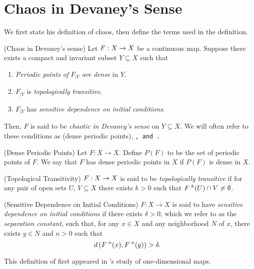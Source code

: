 \documentclass[10pt,draft,twoside]{book}
\begin{document}
\section{Chaos in Devaney's Sense}
We first state his definition of chaos, then define the terms used in the definition.
\begin{definition}
  (Chaos in Devaney's sense) 
  Let $F: X\rightarrow X$ be a continuous map.
  Suppose there exists a compact and invariant subset $Y \subseteq X$ such that
  \begin{enumerate}
    \item \textit{Periodic points of} $F_{|Y}$ \textit{are dense} in $Y$.
    \item $F_{|Y}$ is \textit{topologically transitive}.
    \item $F_{|Y}$ has \textit{sensitive dependence on initial conditions}.
  \end{enumerate}
  Then, $F$ is said to be \textit{chaotic in Devaney's sense} on $Y \subseteq X$.
  We will often refer to these conditions as \dpp (dense periodic points), \tt, and \sdic.
\end{definition}
%
\begin{definition}
  (Dense Periodic Points) 
  Let $F: X \to X$.
  Define $P(F)$ to be the set of periodic points of $F$.
  We say that $F$ has dense periodic points in $X$ if $P(F)$ is dense in $X$.
\end{definition}
%
\begin{definition}
  (Topological Transitivity) 
  $F: X \rightarrow X$ is said to be \textit{topologically transitive} if for any pair of open sets $U$, $V \subseteq X$ there exists $k > 0$ such that $F^{\;k}(U) \cap V \neq \emptyset$.
  \label{defn:transitivity}
   \end{definition}
%
\begin{definition}
  (Sensitive Dependence on Initial Conditions) 
  $F: X \rightarrow X$ is said to have \textit{sensitive dependence on initial conditions} if there exists $\delta > 0$, which we refer to as the \textit{separation constant}, such that, for any $x \in X$ and any neighborhood $N$ of $x$, there exists $y\in N$ and $n > 0$ such that 
  \begin{equation*}
    d\left( F^{\;n}(x), F^{\;n}(y) \right) > \delta.
  \end{equation*}
  \label{defn:sdic}
\end{definition}
%
This definition of \sdic first appeared in \citet{guckenheimer}'s study of one-dimensional maps.
\end{document}
